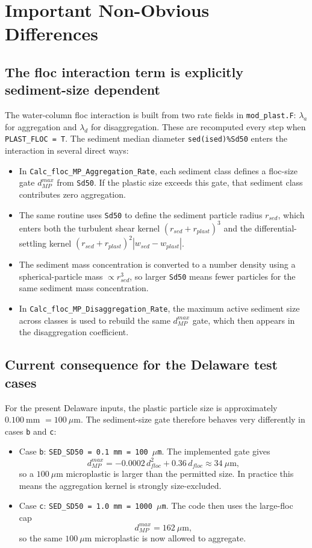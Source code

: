 \documentclass[11pt]{article}
\begin{document}
\section{Important Non-Obvious Differences}
\subsection{The floc interaction term is explicitly sediment-size dependent}
The water-column floc interaction is built from two rate fields in \texttt{mod\_plast.F}:
\(\lambda_a\) for aggregation and \(\lambda_d\) for disaggregation. These are recomputed every step when
\texttt{PLAST\_FLOC = T}. The sediment median diameter \texttt{sed(ised)\%Sd50} enters the interaction in
several direct ways:
\begin{itemize}
\item In \texttt{Calc\_floc\_MP\_Aggregation\_Rate}, each sediment class defines a floc-size gate
\(d_{MP}^{max}\) from \texttt{Sd50}. If the plastic size exceeds this gate, that sediment class contributes
zero aggregation.
\item The same routine uses \texttt{Sd50} to define the sediment particle radius \(r_{sed}\), which enters
both the turbulent shear kernel \((r_{sed}+r_{plast})^3\) and the differential-settling kernel
\((r_{sed}+r_{plast})^2 |w_{sed}-w_{plast}|\).
\item The sediment mass concentration is converted to a number density using a spherical-particle mass
\(\propto r_{sed}^3\), so larger \texttt{Sd50} means fewer particles for the same sediment mass
concentration.
\item In \texttt{Calc\_floc\_MP\_Disaggregation\_Rate}, the maximum active sediment size across classes is used
to rebuild the same \(d_{MP}^{max}\) gate, which then appears in the disaggregation coefficient.
\end{itemize}

\subsection{Current consequence for the Delaware test cases}
For the present Delaware inputs, the plastic particle size is approximately \(0.100\ \mathrm{mm}\)
\(=100\ \mu\mathrm{m}\). The sediment-size gate therefore behaves very differently in cases
\texttt{b} and \texttt{c}:
\begin{itemize}
\item Case \texttt{b}: \texttt{SED\_SD50 = 0.1 mm = 100 \(\mu\)m}. The implemented gate gives
\[
d_{MP}^{max} = -0.0002\,d_{floc}^2 + 0.36\,d_{floc} \approx 34\ \mu\mathrm{m},
\]
so a \(100\ \mu\mathrm{m}\) microplastic is larger than the permitted size. In practice this means the
aggregation kernel is strongly size-excluded.
\item Case \texttt{c}: \texttt{SED\_SD50 = 1.0 mm = 1000 \(\mu\)m}. The code then uses the large-floc cap
\[
d_{MP}^{max} = 162\ \mu\mathrm{m},
\]
so the same \(100\ \mu\mathrm{m}\) microplastic is now allowed to aggregate.
\end{itemize}
\end{document}
